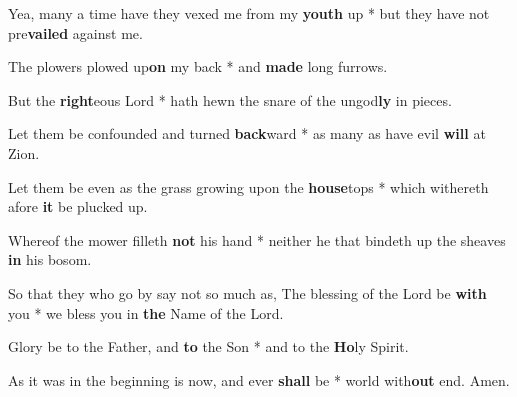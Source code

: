 \begin{multicols}{2}
	Yea, many a time have they vexed me from my \textbf{youth} up * but they have not pre\textbf{vailed} against me.
	
	The plowers plowed up\textbf{on} my back * and \textbf{made} long furrows.
	
	But the \textbf{right}eous Lord * hath hewn the snare of the ungod\textbf{ly} in pieces.
	
	Let them be confounded and turned \textbf{back}ward * as many as have evil \textbf{will} at Zion.
	
	Let them be even as the grass growing upon the \textbf{house}tops * which withereth afore \textbf{it} be plucked up.
	
	Whereof the mower filleth \textbf{not} his hand * neither he that bindeth up the sheaves \textbf{in} his bosom.
	
	So that they who go by say not so much as, The blessing of the Lord be \textbf{with} you * we bless you in \textbf{the} Name of the Lord.
	
	Glory be to the Father, and \textbf{to} the Son * and to the \textbf{Ho}ly Spirit.
	
	As it was in the beginning is now, and ever \textbf{shall} be * world with\textbf{out} end. Amen.
\end{multicols}